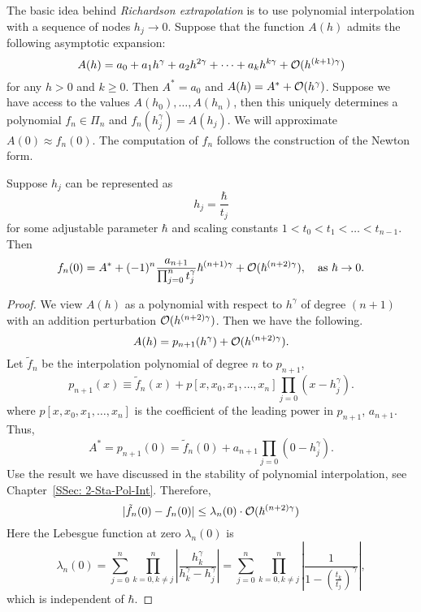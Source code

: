 The basic idea behind \emph{Richardson extrapolation} is to use polynomial interpolation with a sequence of nodes $h_j\to 0$. Suppose that the function $A(h)$ admits the following asymptotic expansion:
\begin{equation}
    A(h) = a_0 + a_1 h^{\gamma} + a_2 h^{2\gamma} + \dots + a_k h^{k\gamma} + \mathcal O(h^{(k+1)\gamma})
\end{equation}
for any $h > 0$ and $k\ge 0$. Then $A^{\ast} = a_0$ and $A(h) = A^{\ast} + \mathcal O(h^{\gamma})$. Suppose we have access to the values $A(h_0),\dots, A(h_n)$, then this uniquely determines a polynomial $f_n\in\Pi_n$ and
$f_n(h_j^{\gamma}) = A(h_j)$. We will approximate $A(0)\approx f_n(0)$. The computation of $f_n$ follows the construction of the Newton form. 
\begin{lemma}
\label{Lem: 3-Ric-Ext-Exp}
    Suppose $h_j$ can be represented as 
    $$h_j = \frac{\hbar}{t_j}$$
    for some adjustable parameter $\hbar$ and scaling constants $ 1 < t_0 < t_1<\dots < t_{n-1}$. Then 
    $$f_n(0) = A^{\ast} + (-1)^n \frac{a_{n+1}}{\prod_{j=0}^n t_j^{\gamma}} \hbar^{(n+1)\gamma} + \mathcal O(\hbar^{(n+2)\gamma}),\quad \text{as }\hbar\to 0.$$
\end{lemma} 
\begin{proof}
    We view $A(h)$ as a polynomial with respect to $h^{\gamma}$ of degree $(n+1)$ with an addition perturbation $\mathcal O(h^{(n+2)\gamma})$. Then we have the following. 
    \begin{equation}
        A(h) = p_{n+1}(h^{\gamma}) + \mathcal O(h^{(n+2)\gamma}).
    \end{equation}
    Let $\tilde{f}_n$ be the interpolation polynomial of degree $n$ to $p_{n+1}$, 
    \begin{equation}
        p_{n+1}(x) \equiv \tilde{f}_n(x) + p[x, x_0, x_1, \dots, x_n] \prod_{j=0}(x - h_j^{\gamma}). 
    \end{equation}
    where $p[x, x_0, x_1, \dots, x_n]$ is the coefficient of the leading power in $p_{n+1}$, $a_{n+1}$. Thus, 
    \begin{equation}
        A^{\ast} = p_{n+1}(0) = \tilde{f}_n(0) +a_{n+1} \prod_{j=0}(0 - h_j^{\gamma}). 
    \end{equation} 
    Use the result we have discussed in the stability of polynomial interpolation, see Chapter~\ref{SSec: 2-Sta-Pol-Int}. Therefore, 
    \begin{equation}
        |\tilde{f}_n(0) - f_n(0)|\le \lambda_n(0) \cdot \mathcal O(\hbar^{(n+2)\gamma})
    \end{equation}
    Here the Lebesgue function at zero $\lambda_n(0)$ is 
    \begin{equation}
        \lambda_n(0) = \sum_{j=0}^n \prod_{k=0, k\neq j}^n \left|\frac{h_k^{\gamma}}{h_k^{\gamma} - h_j^{\gamma}}\right| =  \sum_{j=0}^n \prod_{k=0, k\neq j}^n \left|\frac{1}{1 - (\frac{t_k}{t_j})^{\gamma}}\right|,
    \end{equation}
    which is independent of $\hbar$.
\end{proof}
